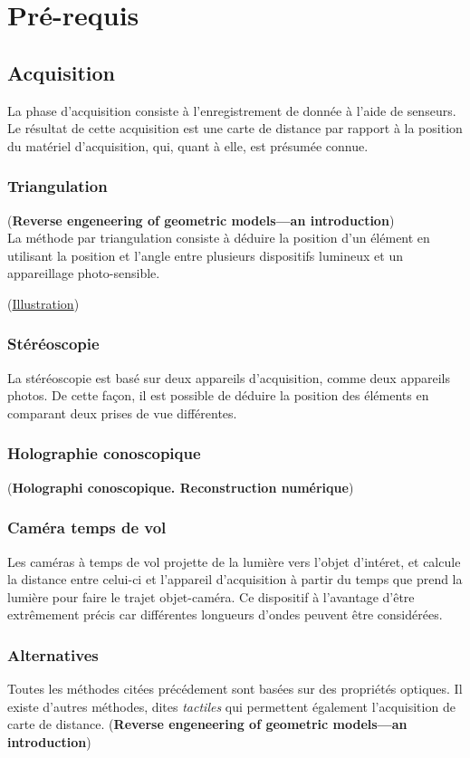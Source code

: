 \chapter{Pré-requis}
\section{Acquisition}
La phase d'acquisition consiste à l'enregistrement de donnée à l'aide de senseurs. Le résultat de cette acquisition est une carte de distance par rapport à la position du matériel d'acquisition, qui, quant à elle, est présumée connue.
\subsection{Triangulation}
(\textbf{Reverse engeneering of geometric models—an introduction})\\

La méthode par triangulation consiste à déduire la position d'un élément en utilisant la position et l'angle entre plusieurs dispositifs lumineux et un appareillage photo-sensible.

(\underline{Illustration})

\subsection{Stéréoscopie}
La stéréoscopie est basé sur deux appareils d'acquisition, comme deux appareils photos. De cette façon, il est possible de déduire la position des éléments en comparant deux prises de vue différentes.

\subsection{Holographie conoscopique}
(\textbf{Holographi conoscopique. Reconstruction numérique})

\subsection{Caméra temps de vol}
Les caméras à temps de vol projette de la lumière vers l'objet d'intéret, et calcule la distance entre celui-ci et l'appareil d'acquisition à partir du temps que prend la lumière pour faire le trajet objet-caméra. Ce dispositif à l'avantage d'être extrêmement précis car différentes longueurs d'ondes peuvent être considérées.

\subsection{Alternatives}
Toutes les méthodes citées précédement sont basées sur des propriétés optiques. Il existe d'autres méthodes, dites \emph{tactiles} qui permettent également l'acquisition de carte de distance. (\textbf{Reverse engeneering of geometric models—an introduction})

